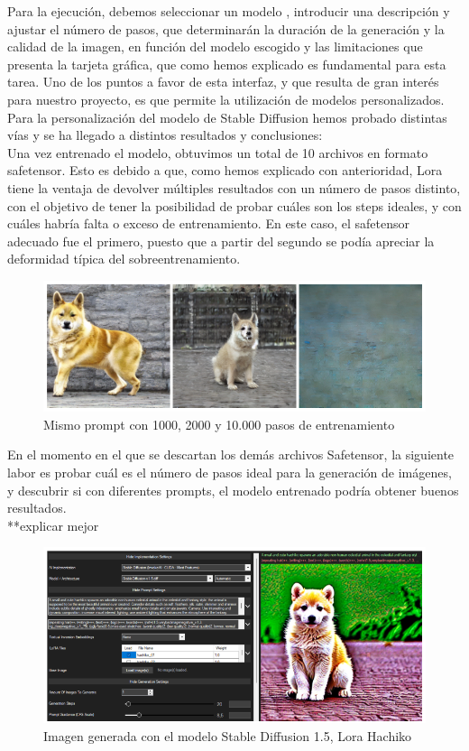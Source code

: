 Para la ejecución, debemos seleccionar un modelo , introducir una descripción y ajustar el número de pasos, que determinarán la duración de la generación y la calidad de la imagen, en función del modelo escogido y las limitaciones que presenta la tarjeta gráfica, que como hemos explicado es fundamental para esta tarea. Uno de los puntos a favor de esta interfaz, y que resulta de gran interés para nuestro proyecto, es que permite la utilización de modelos personalizados. \\

Para la personalización del modelo de Stable Diffusion hemos probado distintas vías y se ha llegado a distintos resultados y conclusiones:\\



 
Una vez entrenado el modelo, obtuvimos un total de 10 archivos en formato safetensor. Esto es debido a que, como hemos explicado con anterioridad, Lora tiene la ventaja de devolver múltiples resultados con un número de pasos distinto, con el objetivo de tener la posibilidad de probar cuáles son los steps ideales, y con cuáles habría falta o exceso de entrenamiento. En este caso, el safetensor adecuado fue el primero, puesto que a partir del segundo se podía apreciar la deformidad típica del sobreentrenamiento.\\
\begin{figure}[h]
	\centering
	\includegraphics[width = 0.6
	\textwidth]{Imagenes/Vectorial/comparacion_hachiko.png}
	\caption{Mismo prompt con 1000, 2000 y 10.000 pasos de entrenamiento}
	\label{fig:comphachi}
\end{figure}

En el momento en el que se descartan los demás archivos Safetensor, la siguiente labor es probar cuál es el número de pasos ideal para la generación de imágenes, y descubrir si con diferentes prompts, el modelo entrenado podría obtener buenos resultados.\\


**explicar mejor


\begin{figure}[h]
	\centering
	\includegraphics[width = 0.6
	\textwidth]{Imagenes/Vectorial/hachiko_detallada.png}
	\caption{Imagen generada con el modelo Stable Diffusion 1.5, Lora Hachiko}
	\label{fig:detallehachi}
\end{figure}



